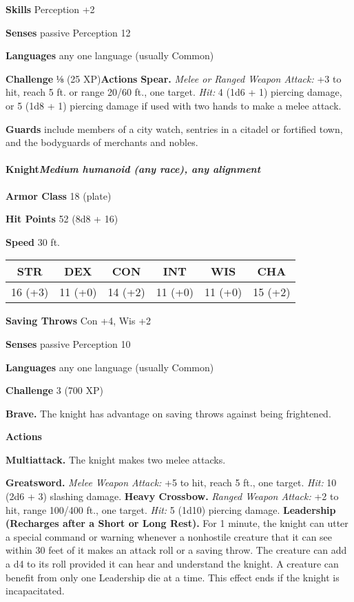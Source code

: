 \documentclass[
]{article}
\begin{document}
\textbf{Skills} Perception +2

\textbf{Senses} passive Perception 12

\textbf{Languages} any one language (usually Common)

\textbf{Challenge} ⅛ (25 XP)\textbf{Actions} \textbf{Spear.} \emph{Melee
or Ranged Weapon Attack:} +3 to hit, reach 5 ft. or range 20/60 ft., one
target. \emph{Hit:} 4 (1d6 + 1) piercing damage, or 5 (1d8 + 1) piercing
damage if used with two hands to make a melee attack.

\textbf{Guards} include members of a city watch, sentries in a citadel
or fortified town, and the bodyguards of merchants and nobles.

\hypertarget{knightmedium-humanoid-any-race-any-alignment}{%
\paragraph{\texorpdfstring{Knight\emph{Medium humanoid (any race), any
alignment}}{KnightMedium humanoid (any race), any alignment}}\label{knightmedium-humanoid-any-race-any-alignment}}

\textbf{Armor Class} 18 (plate)

\textbf{Hit Points} 52 (8d8 + 16)

\textbf{Speed} 30 ft.

\begin{longtable}[]{@{}cccccc@{}}
\toprule
STR & DEX & CON & INT & WIS & CHA\tabularnewline
\midrule
\endhead
16 (+3) & 11 (+0) & 14 (+2) & 11 (+0) & 11 (+0) & 15 (+2)\tabularnewline
\bottomrule
\end{longtable}

\textbf{Saving Throws} Con +4, Wis +2

\textbf{Senses} passive Perception 10

\textbf{Languages} any one language (usually Common)

\textbf{Challenge} 3 (700 XP)

\textbf{Brave.} The knight has advantage on saving throws against being
frightened.

\textbf{Actions}

\textbf{Multiattack.} The knight makes two melee attacks.

\textbf{Greatsword.} \emph{Melee Weapon Attack:} +5 to hit, reach 5 ft.,
one target. \emph{Hit:} 10 (2d6 + 3) slashing damage. \textbf{Heavy
Crossbow.} \emph{Ranged Weapon Attack:} +2 to hit, range 100/400 ft.,
one target. \emph{Hit:} 5 (1d10) piercing damage. \textbf{Leadership
(Recharges after a Short or Long Rest).} For 1 minute, the knight can
utter a special command or warning whenever a nonhostile creature that
it can see within 30 feet of it makes an attack roll or a saving throw.
The creature can add a d4 to its roll provided it can hear and
understand the knight. A creature can benefit from only one Leadership
die at a time. This effect ends if the knight is incapacitated.
\end{document}
